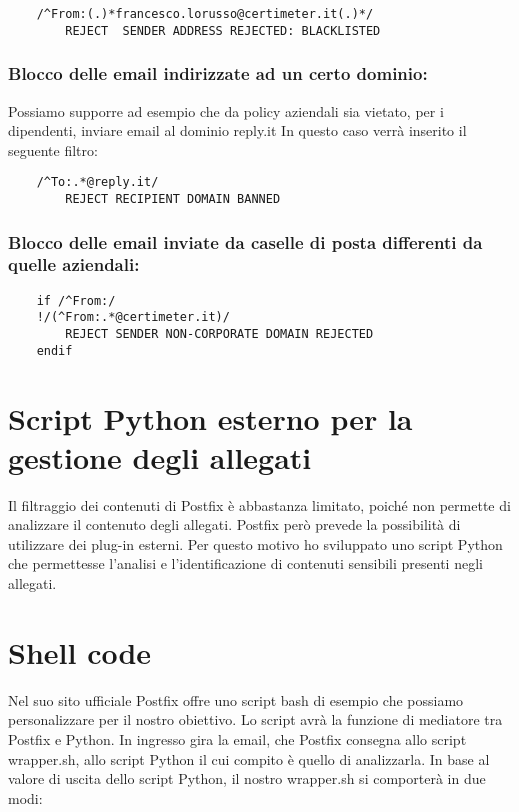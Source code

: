     \begin{verbatim}
    /^From:(.)*francesco.lorusso@certimeter.it(.)*/
        REJECT  SENDER ADDRESS REJECTED: BLACKLISTED
    \end{verbatim}

    \subsubsection{Blocco delle email indirizzate ad un certo dominio:}
    Possiamo supporre ad esempio che da policy aziendali sia vietato, per i dipendenti, 
    inviare email al dominio reply.it In questo caso verrà inserito il seguente filtro:

    \begin{verbatim}
    /^To:.*@reply.it/
        REJECT RECIPIENT DOMAIN BANNED
    \end{verbatim}

    \subsubsection{Blocco delle email inviate da caselle di posta differenti da quelle aziendali:}
    \begin{verbatim}
    if /^From:/
    !/(^From:.*@certimeter.it)/ 
        REJECT SENDER NON-CORPORATE DOMAIN REJECTED
    endif
    \end{verbatim}

    \section{Script Python esterno per la gestione degli allegati}
    Il filtraggio dei contenuti di Postfix è abbastanza limitato, poiché non permette di analizzare il contenuto
    degli allegati. Postfix però prevede la possibilità di utilizzare dei plug-in esterni. Per questo motivo ho 
    sviluppato uno script Python che permettesse l'analisi e l'identificazione di contenuti sensibili presenti 
    negli allegati.


    \section{Shell code}
    Nel suo sito ufficiale Postfix offre uno script bash di esempio che possiamo personalizzare per il nostro 
    obiettivo. Lo script avrà la funzione di mediatore tra Postfix e Python. 
    In ingresso gira la email, che Postfix consegna allo script wrapper.sh, allo script Python 
    il cui compito è quello di analizzarla.
    In base al valore di uscita dello script Python, il nostro wrapper.sh si comporterà in due modi:

